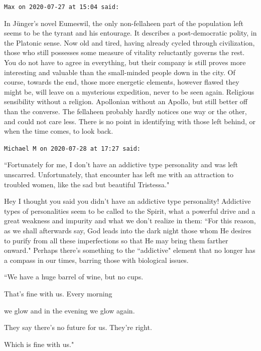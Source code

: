 \begin{footnotesize}\begin{sffamily}



\texttt{Max on 2020-07-27 at 15:04 said: }

In Jünger's novel Eumeswil, the only non-fellaheen part of the population left seems to be the tyrant and his entourage. It describes a post-democratic polity, in the Platonic sense. Now old and tired, having already cycled through civilization, those who still possesses some measure of vitality reluctantly governs the rest. You do not have to agree in everything, but their company is still proves more interesting and valuable than the small-minded people down in the city. Of course, towards the end, those more energetic elements, however flawed they might be, will leave on a mysterious expedition, never to be seen again. Religious sensibility without a religion. Apollonian without an Apollo, but still better off than the converse. The fellaheen probably hardly notices one way or the other, and could not care less. There is no point in identifying with those left behind, or when the time comes, to look back.


\hfill

\texttt{Michael M on 2020-07-28 at 17:27 said: }

``Fortunately for me, I don't have an addictive type personality and was left unscarred. Unfortunately, that encounter has left me with an attraction to troubled women, like the sad but beautiful Tristessa."

Hey I thought you said you didn't have an addictive type personality! Addictive types of personalities seem to be called to the Spirit, what a powerful drive and a great weakness and impurity and what we don't realize in them: ``For this reason, as we shall afterwards say, God leads into the dark night those whom He desires to purify from all these imperfections so that He may bring them farther onward." Perhaps there's something to the ``addictive" element that no longer has a compass in our times, barring those with biological issues.

``We have a huge barrel of wine, but no cups.

That's fine with us. Every morning

we glow and in the evening we glow again.

They say there's no future for us. They're right.

Which is fine with us."


\end{sffamily}
\end{footnotesize}
